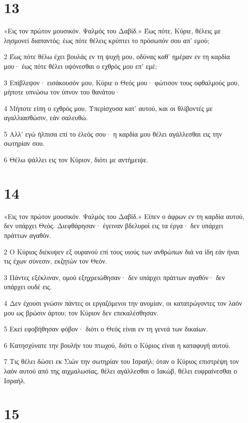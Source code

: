 \chapter{13}

\par «Εις τον πρώτον μουσικόν. Ψαλμός του Δαβίδ.» Έως πότε, Κύριε, θέλεις με λησμονεί διαπαντός; έως πότε θέλεις κρύπτει το πρόσωπόν σου απ' εμού;
\par 2 Έως πότε θέλω έχει βουλάς εν τη ψυχή μου, οδύνας καθ' ημέραν εν τη καρδία μου· έως πότε θέλει υψόνεσθαι ο εχθρός μου επ' εμέ;
\par 3 Επίβλεψον· εισάκουσόν μου, Κύριε ο Θεός μου· φώτισον τους οφθαλμούς μου, μήποτε υπνώσω τον ύπνον του θανάτου·
\par 4 Μήποτε είπη ο εχθρός μου, Υπερίσχυσα κατ' αυτού, και οι θλίβοντές με αγαλλιασθώσιν, εάν σαλευθώ.
\par 5 Αλλ' εγώ ήλπισα επί το έλεός σου· η καρδία μου θέλει αγάλλεσθαι εις την σωτηρίαν σου.
\par 6 Θέλω ψάλλει εις τον Κύριον, διότι με αντήμειψε.

\chapter{14}

\par «Εις τον πρώτον μουσικόν. Ψαλμός του Δαβίδ.» Είπεν ο άφρων εν τη καρδία αυτού, δεν υπάρχει Θεός. Διεφθάρησαν· έγειναν βδελυροί εις τα έργα· δεν υπάρχει πράττων αγαθόν.
\par 2 Ο Κύριος διέκυψεν εξ ουρανού επί τους υιούς των ανθρώπων διά να ίδη εάν ήναι τις έχων σύνεσιν, εκζητών τον Θεόν.
\par 3 Πάντες εξέκλιναν, ομού εξηχρειώθησαν· δεν υπάρχει πράττων αγαθόν· δεν υπάρχει ουδέ εις.
\par 4 Δεν έχουσι γνώσιν πάντες οι εργαζόμενοι την ανομίαν, οι κατατρώγοντες τον λαόν μου ως βρώσιν άρτου; τον Κύριον δεν επεκαλέσθησαν.
\par 5 Εκεί εφοβήθησαν φόβον· διότι ο Θεός είναι εν τη γενεά των δικαίων.
\par 6 Κατησχύνατε την βουλήν του πτωχού, διότι ο Κύριος είναι η καταφυγή αυτού.
\par 7 Τις θέλει δώσει εκ Σιών την σωτηρίαν του Ισραήλ; όταν ο Κύριος επιστρέψη τον λαόν αυτού από της αιχμαλωσίας, θέλει αγάλλεσθαι ο Ιακώβ, θέλει ευφραίνεσθαι ο Ισραήλ.

\chapter{15}

